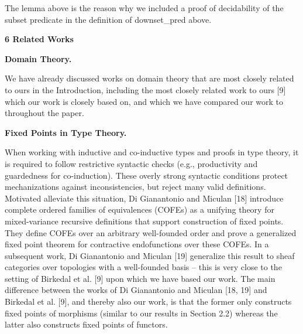 The lemma above is the reason why we included a proof of decidability of the subset predicate in the definition of downset\_pred above.\par
 
 
 


 
\par\medskip\noindent\textbf{6 Related Works}\par
 
 
\par\medskip\noindent\textbf{Domain Theory.}\par
 
 
We have already discussed works on domain theory that are most closely related to ours in the Introduction, including the most closely related work to ours [9] which our work is closely based on, and which we have compared our work to throughout the paper.\par
 
 
 
 
\par\medskip\noindent\textbf{Fixed Points in Type Theory.}\par
 
 
When working with inductive and co-inductive types and proofs in type theory, it is required to follow restrictive syntactic checks (e.g., productivity and guardedness for co-induction). These overly strong syntactic conditions protect mechanizations against inconsistencies, but reject many valid definitions. Motivated alleviate this situation, Di Gianantonio and Miculan [18] introduce complete ordered families of equivalences (COFEs) as a unifying theory for mixed-variance recursive definitions that support construction of fixed points. They define COFEs over an arbitrary well-founded order and prove a generalized fixed point theorem for contractive endofunctions over these COFEs. In a subsequent work, Di Gianantonio and Miculan [19] generalize this result to sheaf categories over topologies with a well-founded basis – this is very close to the setting of Birkedal et al. [9] upon which we have based our work. The main difference between the works of Di Gianantonio and Miculan [18, 19] and Birkedal et al. [9], and thereby also our work, is that the former only constructs fixed points of morphisms (similar to our results in Section 2.2) whereas the latter also constructs fixed points of functors.\par
 
